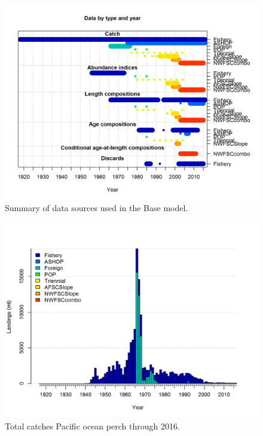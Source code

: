 \documentclass[12pt,]{article}
\begin{document}
\begin{figure}
\centering
\includegraphics{r4ss/plots_mod1/data_plot.png}
\caption{Summary of data sources used in the Base model.
\label{fig:data_plot}}
\end{figure}

\FloatBarrier

\begin{figure}
\centering
\includegraphics{r4ss/plots_mod1/catch2 landings stacked.png}
\caption{Total catches Pacific ocean perch through 2016.
\label{fig:Catch}}
\end{figure}

\FloatBarrier
\end{document}
